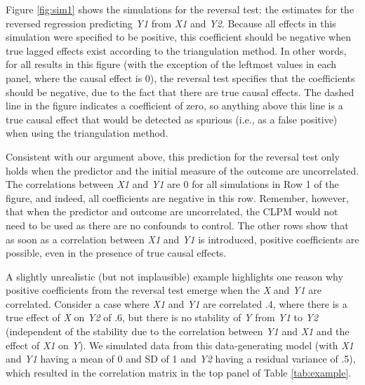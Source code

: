 \documentclass[
  man,floatsintext]{apa6}
\begin{document}
Figure \ref{fig:sim1} shows the simulations for the reversal test: the estimates for the reversed regression predicting \emph{Y1} from \emph{X1} and \emph{Y2}. Because all effects in this simulation were specified to be positive, this coefficient should be negative when true lagged effects exist according to the triangulation method. In other words, for all results in this figure (with the exception of the leftmost values in each panel, where the causal effect is 0), the reversal test specifies that the coefficients should be negative, due to the fact that there are true causal effects. The dashed line in the figure indicates a coefficient of zero, so anything above this line is a true causal effect that would be detected as spurious (i.e., as a false positive) when using the triangulation method.

Consistent with our argument above, this prediction for the reversal test only holds when the predictor and the initial measure of the outcome are uncorrelated. The correlations between \emph{X1} and \emph{Y1} are 0 for all simulations in Row 1 of the figure, and indeed, all coefficients are negative in this row. Remember, however, that when the predictor and outcome are uncorrelated, the CLPM would not need to be used as there are no confounds to control. The other rows show that as soon as a correlation between \emph{X1} and \emph{Y1} is introduced, positive coefficients are possible, even in the presence of true causal effects.

A slightly unrealistic (but not implausible) example highlights one reason why positive coefficients from the reversal test emerge when the \emph{X} and \emph{Y1} are correlated. Consider a case where \emph{X1} and \emph{Y1} are correlated .4, where there is a true effect of \emph{X} on \emph{Y2} of .6, but there is no stability of \emph{Y} from \emph{Y1} to \emph{Y2} (independent of the stability due to the correlation between \emph{Y1} and \emph{X1} and the effect of \emph{X1} on \emph{Y}). We simulated data from this data-generating model (with \emph{X1} and \emph{Y1} having a mean of 0 and SD of 1 and \emph{Y2} having a residual variance of .5), which resulted in the correlation matrix in the top panel of Table \ref{tab:example}.
\end{document}
